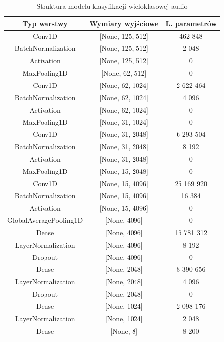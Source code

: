\begin{table}[htbp]
    \centering
    \caption{Struktura modelu klasyfikacji wieloklasowej audio}
    \label{tab:multiclass_audio_model_structure}
    \begin{tabular}{|c|c|c|}
        \hline
        \textbf{Typ warstwy} & \textbf{Wymiary wyjściowe} & \textbf{L. parametrów} \\
        \hline
        Conv1D & [None, 125, 512] & 462 848 \\
        \hline
        BatchNormalization & [None, 125, 512] & 2 048 \\
        \hline
        Activation & [None, 125, 512] & 0 \\
        \hline
        MaxPooling1D & [None, 62, 512] & 0 \\
        \hline
        Conv1D & [None, 62, 1024] & 2 622 464 \\
        \hline
        BatchNormalization & [None, 62, 1024] & 4 096 \\
        \hline
        Activation & [None, 62, 1024] & 0 \\
        \hline
        MaxPooling1D & [None, 31, 1024] & 0 \\
        \hline
        Conv1D & [None, 31, 2048] & 6 293 504 \\
        \hline
        BatchNormalization & [None, 31, 2048] & 8 192 \\
        \hline
        Activation & [None, 31, 2048] & 0 \\
        \hline
        MaxPooling1D & [None, 15, 2048] & 0 \\
        \hline
        Conv1D & [None, 15, 4096] & 25 169 920 \\
        \hline
        BatchNormalization & [None, 15, 4096] & 16 384 \\
        \hline
        Activation & [None, 15, 4096] & 0 \\
        \hline
        GlobalAveragePooling1D & [None, 4096] & 0 \\
        \hline
        Dense & [None, 4096] & 16 781 312 \\
        \hline
        LayerNormalization & [None, 4096] & 8 192 \\
        \hline
        Dropout & [None, 4096] & 0 \\
        \hline
        Dense & [None, 2048] & 8 390 656 \\
        \hline
        LayerNormalization & [None, 2048] & 4 096 \\
        \hline
        Dropout & [None, 2048] & 0 \\
        \hline
        Dense & [None, 1024] & 2 098 176 \\
        \hline
        LayerNormalization & [None, 1024] & 2 048 \\
        \hline
        Dense & [None, 8] & 8 200 \\
        \hline
    \end{tabular}
\end{table}
